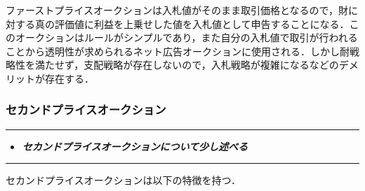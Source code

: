 ファーストプライスオークションは入札値がそのまま取引価格となるので，財に対する真の評価値に利益を上乗せした値を入札値として申告することになる．このオークションはルールがシンプルであり，また自分の入札値で取引が行われることから透明性が求められるネット広告オークションに使用される．しかし耐戦略性を満たせず，支配戦略が存在しないので，入札戦略が複雑になるなどのデメリットが存在する．

\hypertarget{ux30bbux30abux30f3ux30c9ux30d7ux30e9ux30a4ux30b9ux30aaux30fcux30afux30b7ux30e7ux30f3}{%
\subsubsection{セカンドプライスオークション}\label{ux30bbux30abux30f3ux30c9ux30d7ux30e9ux30a4ux30b9ux30aaux30fcux30afux30b7ux30e7ux30f3}}

\begin{center}\rule{0.5\linewidth}{0.5pt}\end{center}

\begin{itemize}
\tightlist
\item
  \textbf{\emph{セカンドプライスオークションについて少し述べる}}
\end{itemize}

\begin{center}\rule{0.5\linewidth}{0.5pt}\end{center}

セカンドプライスオークションは以下の特徴を持つ．

